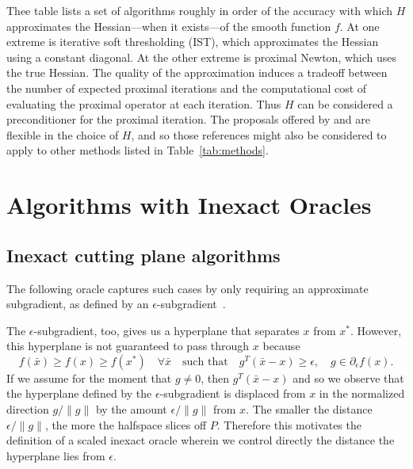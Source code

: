 Thee table lists a set of algorithms roughly in order of the accuracy
with which $H$ approximates the Hessian---when it exists---of the
smooth function $f$. At one extreme is iterative soft thresholding
(IST), which approximates the Hessian using a constant diagonal. At
the other extreme is proximal Newton, which uses the true Hessian. The
quality of the approximation induces a tradeoff between the number of
expected proximal iterations and the computational cost of evaluating
the proximal operator at each iteration. Thus $H$ can be considered a
preconditioner for the proximal iteration. The proposals offered by
\cite{JMLR:v16:trandihn15a} and \cite{Byrd2016} are flexible in the
choice of $H$, and so those references might also be considered to
apply to other methods listed in Table~\ref{tab:methods}.


\section{Algorithms with Inexact Oracles}


\subsection{Inexact cutting plane algorithms}

The following oracle captures such cases by only requiring an approximate
subgradient, as defined by an
$\epsilon$-subgradient~\cite[p.~219]{Roc70}.

The $\epsilon$-subgradient, too, gives us a hyperplane that separates
$x$ from $x^*$. However, this hyperplane is not guaranteed to pass
through $x$ because
\[
f(\bar{x})\geq f(x) \geq f(x^*) \quad\forall \bar{x} \quad \text{such that} \quad g^T(\bar{x}-x)\geq\epsilon, \quad g \in \partial_\epsilon f(x).
\]
If we assume for the moment that $g\ne0$, then $g^T(\bar{x}-x)$
and so we observe that the hyperplane defined by the
$\epsilon$-subgradient is displaced from $x$ in the normalized
direction $g/\|g\|$ by the amount $\epsilon/\|g\|$ from $x$. The
smaller the distance $\epsilon/\|g\|$, the more the halfspace slices
off $P$. Therefore this motivates the definition of a scaled inexact
oracle wherein we control directly the distance the hyperplane lies
from $\epsilon$.

